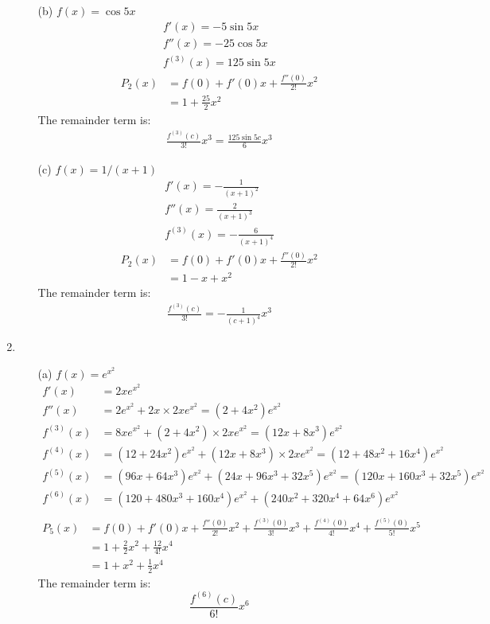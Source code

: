 \documentclass[UTF8]{ctexart}
\begin{document}
\begin{enumerate}
\begin{itemize}
\item[(b)] $f(x) = \cos 5x$
\begin{gather*}
f'(x) = -5\sin 5x \\
f''(x) = -25 \cos 5x \\
f^{(3)}(x) = 125 \sin 5x
\end{gather*}
\begin{align*}
P_2(x) &= f(0) + f'(0)x + \frac{f''(0)}{2!} x^2 \\
&= 1 + \frac{25}{2}x^2
\end{align*}
The remainder term is:
\begin{align*}
\frac{f^{(3)}(c)}{3!}x^3 = \frac{125 \sin5c}{6}x^3
\end{align*}

\item[(c)] $f(x) = 1/(x+1)$
\begin{gather*}
f'(x) = -\frac{1}{(x+1)^2} \\
f''(x) = \frac{2}{(x+1)^3} \\
f^{(3)}(x) = -\frac{6}{(x+1)^4}
\end{gather*}
\begin{align*}
P_2(x) &= f(0) + f'(0)x + \frac{f''(0)}{2!}x^2 \\
&= 1 - x + x^2
\end{align*}
The remainder term is:
\begin{align*}
\frac{f^{(3)}(c)}{3!} = -\frac{1}{(c+1)^4}x^3
\end{align*}

\end{itemize}

\item \begin{itemize}
\item[(a)] $f(x) = e^{x^2}$ 
\begin{align*}
f'(x) &= 2xe^{x^2} \\
f''(x) &= 2e^{x^2} + 2x \times 2xe^{x^2} = (2 + 4x^2) e^{x^2} \\
f^{(3)}(x) &= 8xe^{x^2} + (2 + 4x^2) \times 2xe^{x^2} = (12x + 8x^3)e^{x^2} \\
f^{(4)}(x) &= (12 + 24x^2)e^{x^2} + (12x + 8x^3)\times 2xe^{x^2} = (12 + 48x^2 + 16x^4)e^{x^2} \\
f^{(5)}(x) &= (96x + 64x^3)e^{x^2} + (24x + 96x^3 + 32x^5)e^{x^2} = (120x + 160x^3 + 32x^5)e^{x^2}\\
f^{(6)}(x) &= (120 + 480x^3 + 160x^4)e^{x^2} + (240x^2 + 320x^4 + 64x^6)e^{x^2} \\
\end{align*}
\begin{align*}
P_5(x) &= f(0) + f'(0)x  + \frac{f''(0)}{2!} x^2 + \frac{f^{(3)}(0)}{3!} x^3 + \frac{f^{(4)}(0)}{4!} x^4 + \frac{f^{(5)}(0)}{5!} x^5 \\
&= 1 + \frac{2}{2}x^2 + \frac{12}{4!}x^4 \\
&= 1 + x^2 + \frac{1}{2}x^4
\end{align*}
The remainder term is:
\[
\frac{f^{(6)}(c)}{6!} x^6
\]


\end{itemize}
\end{enumerate}
\end{document}
